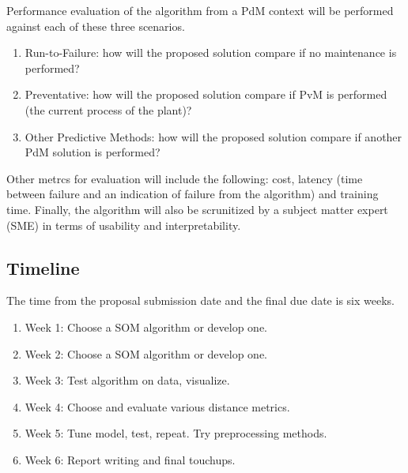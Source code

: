 Performance evaluation of the algorithm from a PdM context will be performed against each of these three scenarios.
\begin{enumerate}
    \item Run-to-Failure: how will the proposed solution compare if no maintenance is performed?
    \item Preventative: how will the proposed solution compare if PvM is performed (the current process of the plant)?
    \item Other Predictive Methods: how will the proposed solution compare if another PdM solution is performed?
\end{enumerate}

Other metrcs for evaluation will include the following: cost, latency (time between failure and an indication of failure from the algorithm) and training time.
Finally, the algorithm will also be scrunitized by a subject matter expert (SME) in terms of usability and interpretability.


\subsection{Timeline}

The time from the proposal submission date and the final due date is six weeks.

\begin{enumerate}
	\item Week 1: Choose a SOM algorithm or develop one.
    \item Week 2: Choose a SOM algorithm or develop one.
    \item Week 3: Test algorithm on data, visualize.
    \item Week 4: Choose and evaluate various distance metrics.
    \item Week 5: Tune model, test, repeat. Try preprocessing methods.
    \item Week 6: Report writing and final touchups.
\end{enumerate}